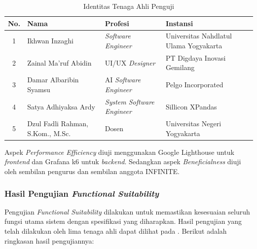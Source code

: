 \begin{table}[H]
      \centering
      \caption{Identitas Tenaga Ahli Penguji}
      \label{tab:tenaga-ahli-penguji}
      \begin{tabular}{|c|p{4cm}|p{3cm}|p{4cm}|}
            \hline
            \textbf{No.} & \textbf{Nama}                          & \textbf{Profesi}                  & \textbf{Instansi}             \\
            \hline
            1            & Ikhwan Inzaghi                         & \textit{Software Engineer}
                         & Universitas Nahdlatul Ulama Yogyakarta                                                                     \\
            \hline
            2            & Zainal Ma'ruf Abidin                   & UI/UX \textit{Designer}           & PT Digdaya Inovasi Gemilang
            \\
            \hline
            3            & Damar Albaribin Syamsu                 & AI \textit{Software Engineer}     & Pelgo Incorporated            \\
            \hline
            4            & Satya Adhiyaksa Ardy                   & \textit{System Software Engineer} & Sillicon XPandas              \\
            \hline
            5            & Dzul Fadli Rahman, S.Kom., M.Sc.       & Dosen                             & Universitas Negeri Yogyakarta
            \\
            \hline
      \end{tabular}
\end{table}

Aspek \textit{Performance Efficiency} diuji menggunakan Google Lighthouse untuk \textit{frontend} dan Grafana k6 untuk \textit{backend}. Sedangkan aspek \textit{Beneficialness} diuji oleh sembilan pengurus dan sembilan anggota INFINITE.

\subsubsection{Hasil Pengujian \textit{Functional Suitability}}

Pengujian \textit{Functional Suitability} dilakukan untuk memastikan kesesuaian seluruh fungsi utama sistem dengan spesifikasi yang diharapkan. Hasil pengujian  yang telah dilakukan oleh lima tenaga ahli dapat dilihat pada . Berikut adalah ringkasan hasil pengujiannya:

